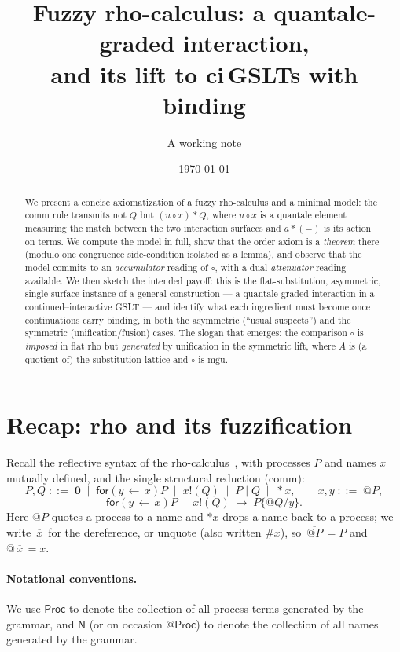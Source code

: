 \documentclass[11pt]{article}
\title{\bf Fuzzy rho-calculus: a quantale-graded interaction,\\[2pt]
\large and its lift to ci\,GSLTs with binding}
\author{A working note}
\date{\today}
\makeatletter
\theoremstyle{plain}
\theoremstyle{definition}
\theoremstyle{remark}
\newcommand{\nil}{\mathbf{0}}
\newcommand{\for}[2]{\mathsf{for}(#1 \,{\leftarrow}\, #2)}
\newcommand{\out}[2]{#1\mathord{!}(#2)}
\newcommand{\drop}[1]{{*}#1}
\newcommand{\quo}[1]{@#1}
\newcommand{\dr}[1]{\,\overline{#1}\,}   %
\newcommand{\subst}[2]{\{#1/#2\}}
\newcommand{\act}{\mathbin{*}}
\newcommand{\cmp}{\mathbin{\circ}}       %
\newcommand{\redto}{\longrightarrow}
\newcommand{\Proc}{\mathsf{Proc}}
\newcommand{\Names}{\mathsf{N}}
\newcommand{\mgu}{\mathrm{mgu}}
\makeatother
\begin{document}
\maketitle

\begin{abstract}
We present a concise axiomatization of a fuzzy rho-calculus and a minimal model: the comm rule
transmits not $Q$ but $(u\cmp x)\act Q$, where $u\cmp x$ is a quantale element measuring the match
between the two interaction surfaces and $a\act(-)$ is its action on terms. We compute the model in
full, show that the order axiom is a \emph{theorem} there (modulo one congruence side-condition
isolated as a lemma), and observe that the model commits to an \emph{accumulator} reading of $\cmp$,
with a dual \emph{attenuator} reading available. We then sketch the intended payoff: this is the flat-substitution,
asymmetric, single-surface instance of a general construction --- a quantale-graded interaction in a
continued--interactive GSLT --- and identify what each ingredient must become once continuations
carry binding, in both the asymmetric (``usual suspects'') and the symmetric (unification/fusion)
cases. The slogan that emerges: the comparison $\cmp$ is \emph{imposed} in flat rho but
\emph{generated} by unification in the symmetric lift, where $A$ is (a quotient of) the substitution
lattice and $\cmp$ is $\mgu$.
\end{abstract}

\section{Recap: rho and its fuzzification}

Recall the reflective syntax of the rho-calculus~\cite{rho}, with processes $P$ and names $x$
mutually defined, and the single structural reduction (comm):
\[
P,Q \;::=\; \nil \;\mid\; \for{y}{x}P \;\mid\; \out{x}{Q} \;\mid\; P\mid Q \;\mid\; \drop{x},
\qquad x,y \;::=\; \quo{P},
\]
\[
\for{y}{x}P \;\mid\; \out{x}{Q} \;\redto\; P\subst{\quo Q}{y}.
\]
Here $\quo{P}$ quotes a process to a name and $\drop{x}$ drops a name back to a process; we write
$\dr{x}$ for the dereference, or unquote (also written $\#x$), so $\dr{\quo P}=P$ and $\quo{\dr x}=x$.

\paragraph{Notational conventions.} We use $\Proc$ to denote the collection of all process terms generated by the grammar, and $\Names$ (or on occasion $\mathsf{@}\Proc$) to denote the collection of all names generated by the grammar.
\end{document}
